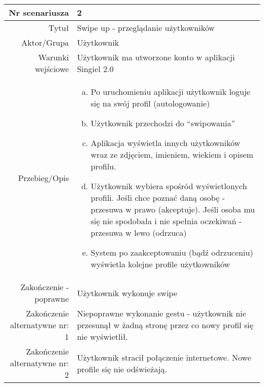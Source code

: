 \documentclass[12pt,a4paper]{article}
\begin{document}
\begin{tabular}{|r|l|} \hline
Nr scenariusza & 2 \\
\hline
Tytuł & Swipe up - przeglądanie użytkowników \\
\hline
Aktor/Grupa & Użytkownik \\
\hline
Warunki wejściowe & Użytkownik ma utworzone konto w aplikacji Singiel 2.0  \\
\hline
Przebieg/Opis & 
\begin{enumerate}[a)]
\item Po uruchomieniu aplikacji użytkownik loguje się na swój profil (autologowanie)
\item Użytkownik przechodzi do “swipowania”
\item Aplikacja wyświetla innych użytkowników wraz ze zdjęciem, imieniem, wiekiem i opisem profilu.
\item Użytkownik wybiera spośród wyświetlonych profili. Jeśli chce poznać daną osobę - przesuwa w prawo (akceptuje). Jeśli osoba mu się nie spodobała i nie spełnia oczekiwań - przesuwa w lewo (odrzuca)
\item System po zaakceptowaniu (bądź odrzuceniu) wyświetla kolejne profile użytkowników 


\end{enumerate}
\\
\hline
Zakończenie - poprawne & Użytkownik wykonuje swipe
\\ 
\hline
Zakończenie alternatywne nr: 1 & Niepoprawne wykonanie gestu - użytkownik nie przesunął w żadną stronę przez co nowy profil się nie wyświetlił.
\\
\hline
Zakończenie alternatywne nr: 2 & Użytkownik stracił połączenie internetowe. Nowe profile się nie odświeżają. 
\\

\hline
\end{tabular}
\end{document}

